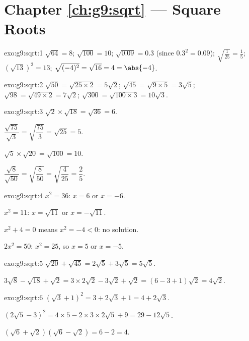 \section*{Chapter \ref{ch:g9:sqrt} --- Square Roots}

\begin{solution}{exo:g9:sqrt:1}
$\sqrt{64} = 8$; \quad $\sqrt{100} = 10$; \quad
$\sqrt{0.09} = 0.3$ (since $0.3^2 = 0.09$); \quad
$\sqrt{\frac{1}{25}} = \frac15$; \quad
$\left(\sqrt{13}\right)^2 = 13$; \quad
$\sqrt{(-4)^2} = \sqrt{16} = 4 = \abs{-4}$.
\end{solution}

\begin{solution}{exo:g9:sqrt:2}
$\sqrt{50} = \sqrt{25 \times 2} = 5\sqrt2$; \quad
$\sqrt{45} = \sqrt{9 \times 5} = 3\sqrt5$; \quad
$\sqrt{98} = \sqrt{49 \times 2} = 7\sqrt2$; \quad
$\sqrt{300} = \sqrt{100 \times 3} = 10\sqrt3$.
\end{solution}

\begin{solution}{exo:g9:sqrt:3}
$\sqrt2 \times \sqrt{18} = \sqrt{36} = 6$.

$\dfrac{\sqrt{75}}{\sqrt3} = \sqrt{\dfrac{75}{3}} = \sqrt{25} = 5$.

$\sqrt5 \times \sqrt{20} = \sqrt{100} = 10$.

$\dfrac{\sqrt8}{\sqrt{50}} = \sqrt{\dfrac{8}{50}} = \sqrt{\dfrac{4}{25}}
= \dfrac25$.
\end{solution}

\begin{solution}{exo:g9:sqrt:4}
$x^2 = 36$: $x = 6$ or $x = -6$.

$x^2 = 11$: $x = \sqrt{11}$ or $x = -\sqrt{11}$.

$x^2 + 4 = 0$ means $x^2 = -4 < 0$: no solution.

$2x^2 = 50$: $x^2 = 25$, so $x = 5$ or $x = -5$.
\end{solution}

\begin{solution}{exo:g9:sqrt:5}
$\sqrt{20} + \sqrt{45} = 2\sqrt5 + 3\sqrt5 = 5\sqrt5$.

$3\sqrt8 - \sqrt{18} + \sqrt2 = 3 \times 2\sqrt2 - 3\sqrt2 + \sqrt2
= (6 - 3 + 1)\sqrt2 = 4\sqrt2$.
\end{solution}

\begin{solution}{exo:g9:sqrt:6}
$\left(\sqrt3 + 1\right)^2 = 3 + 2\sqrt3 + 1 = 4 + 2\sqrt3$.

$\left(2\sqrt5 - 3\right)^2 = 4 \times 5 - 2 \times 3 \times 2\sqrt5 + 9
= 29 - 12\sqrt5$.

$\left(\sqrt6 + \sqrt2\right)\left(\sqrt6 - \sqrt2\right) = 6 - 2 = 4$.
\end{solution}

